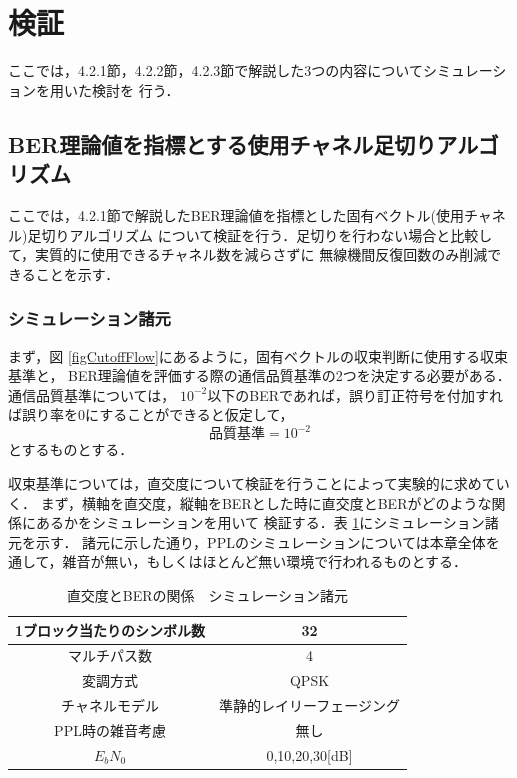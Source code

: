 \section{検証}
ここでは，4.2.1節，4.2.2節，4.2.3節で解説した3つの内容についてシミュレーションを用いた検討を
行う．

\subsection{BER理論値を指標とする使用チャネル足切りアルゴリズム}
ここでは，4.2.1節で解説したBER理論値を指標とした固有ベクトル(使用チャネル)足切りアルゴリズム
について検証を行う．足切りを行わない場合と比較して，実質的に使用できるチャネル数を減らさずに
無線機間反復回数のみ削減できることを示す．

\subsubsection{シミュレーション諸元}
まず，図 \ref{figCutoffFlow}にあるように，固有ベクトルの収束判断に使用する収束基準と，
BER理論値を評価する際の通信品質基準の2つを決定する必要がある．通信品質基準については，
$10^{-2}$以下のBERであれば，誤り訂正符号を付加すれば誤り率を0にすることができると仮定して，
\begin{equation}
    品質基準=10^{-2}
\end{equation}
とするものとする．

収束基準については，直交度について検証を行うことによって実験的に求めていく．
まず，横軸を直交度，縦軸をBERとした時に直交度とBERがどのような関係にあるかをシミュレーションを用いて
検証する．表 \ref{tabCutoff1}にシミュレーション諸元を示す．
諸元に示した通り，PPLのシミュレーションについては本章全体を通して，雑音が無い，もしくはほとんど無い環境で行われるものとする．

\begin{table}[h]
    \begin{tabular}{|c|c|} \hline
        1ブロック当たりのシンボル数 & 32 \\ \hline
        マルチパス数 & 4 \\ \hline
        変調方式 & QPSK \\ \hline
        チャネルモデル & 準静的レイリーフェージング \\ \hline
        PPL時の雑音考慮 & 無し \\ \hline
        $E_bN_0$ & 0,10,20,30[dB] \\ \hline
    \end{tabular}
    \centering
    \caption{直交度とBERの関係　シミュレーション諸元}
    \label{tabCutoff1}
\end{table}

